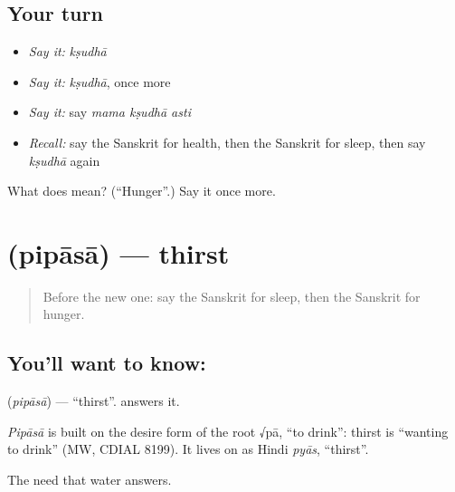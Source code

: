 \subsection*{Your turn}
\begin{itemize}
\raggedright
  \item \emph{Say it:} \emph{kṣudhā}
  \item \emph{Say it:} \emph{kṣudhā}, once more
  \item \emph{Say it:} say \emph{mama kṣudhā asti}
  \item \emph{Recall:} say the Sanskrit for health, then the Sanskrit for sleep, then say \emph{kṣudhā} again
\end{itemize}

\begin{tcolorbox}[breakable,colback=teal!4,colframe=teal!35!black,title={Before you move on}]
What does  mean? (\textquotedblleft{}Hunger\textquotedblright{}.) Say it once more.
\end{tcolorbox}
\section[\texorpdfstring{\sk{पिपासा} (pipāsā)}{पिपासा (pipāsā)}]{ (pipāsā) — thirst}

\label{lesson:SA-C67-thirst}



\begin{quote}
Before the new one: say the Sanskrit for sleep, then the Sanskrit for hunger.
\end{quote}

\subsection*{You'll want to know: }
\textbf{} (\emph{pipāsā}) — \textquotedblleft{}thirst\textquotedblright{}. \textbf{} answers it.

\begin{cousinweb}
\emph{Pipāsā} is built on the desire form of the root √pā, \textquotedblleft{}to drink\textquotedblright{}: thirst is \textquotedblleft{}wanting to drink\textquotedblright{} (MW, CDIAL 8199). It lives on as Hindi \emph{pyās}, \textquotedblleft{}thirst\textquotedblright{}.
\end{cousinweb}

\begin{grammarlens}[title={What you've built}]
The need that water answers.
\end{grammarlens}

